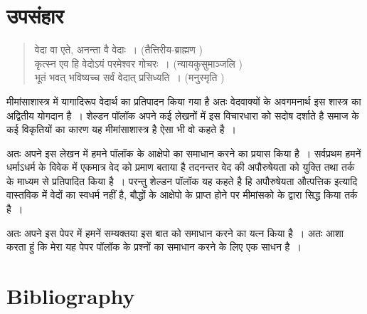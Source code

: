 \vfill\eject

\section*{उपसंहार}

\vskip 15pt

\begin{verse}
वेदा वा एते, अनन्ता वै वेदाः~। (तैत्तिरीय-ब्राह्मण )\\कृत्स्न एव हि वेदोऽयं परमेश्वर गोचरः~। (न्यायकुसुमाञ्जलि )\\भूतं भवत् भविष्यच्च सर्वं वेदात् प्रसिध्यति~। (मनुस्मृति )
\end{verse}

\vskip 6pt

मीमांसाशास्त्र में यागादिरूप वेदार्थ का प्रतिपादन किया गया है अतः वेदवाक्यों के अवगमनार्थ इस शास्त्र का अद्वितीय योगदान है~। शेल्डन पॉलॉक अपने कई लेखनों में इस विचारधारा को सदोष दर्शाते है समाज के कई विकृतियों का कारण यह मीमांसाशास्त्र है ऐसा भी वो कहते है~।

अतः अपने इस लेखन में हमने पॉलॉक के आक्षेपो का समाधान करने का प्रयास किया है~। सर्वप्रथम हमनें धर्माऽधर्म के विवेक में एकमात्र वेद को प्रमाण बताया है तदनन्तर वेद की अपौरुषेयता को युक्ति तथा तर्क के माध्यम से प्रतिपादित किया है~। परन्तु शेल्डन पॉलॉक यह कहते है हि अपौरुषेयता औत्पत्तिक इत्यादि वास्तविक में वेदों का स्वधर्म नहीं है, बौद्धों के आक्षेपो के प्राप्त होने पर मीमांसको के द्वारा सिद्ध किया तर्क है~। 

अतः अपने इस पेपर में हमनें सम्यक्तया इस बात को समाधान करने का यत्न किया है~। अतः आशा करता हुं कि मेरा यह पेपर पॉलॉक के प्रश्नों का समाधान करने के लिए एक साधन है~।

\egroup

\bgroup

\selecteng

\section*{Bibliography}

\retainauthsanskrit

